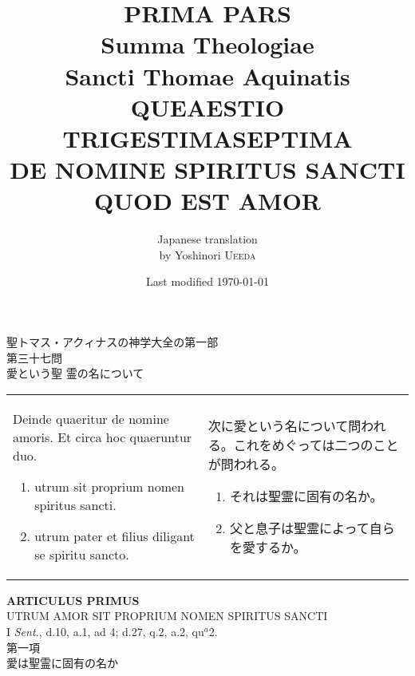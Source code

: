 \documentclass[10pt]{jsarticle} %
\title{{\bf PRIMA PARS}\\{\Huge Summa Theologiae}\\Sancti Thomae
Aquinatis\\{\sffamily QUEAESTIO TRIGESTIMASEPTIMA}\\DE NOMINE SPIRITUS
SANCTI QUOD EST AMOR}
\author{Japanese translation\\by Yoshinori {\scshape Ueeda}}
\date{Last modified \today}
\begin{document}
\maketitle

\begin{center}
{\Large 聖トマス・アクィナスの神学大全の第一部\\第三十七問\\愛という聖
 霊の名について}
\end{center}

\thispagestyle{empty}
\begin{longtable}{p{21em}p{21em}}
Deinde quaeritur de nomine amoris. Et circa hoc quaeruntur duo. 

\begin{enumerate}
 \item utrum sit proprium nomen spiritus sancti.
 \item utrum pater et filius diligant se spiritu sancto.
\end{enumerate}

&

次に愛という名について問われる。これをめぐっては二つのことが問われる。

\begin{enumerate}
 \item それは聖霊に固有の名か。
 \item 父と息子は聖霊によって自らを愛するか。
\end{enumerate}

\end{longtable}



\newpage


\begin{center}
{\Large {\bf ARTICULUS PRIMUS}}\\
{\large UTRUM AMOR SIT PROPRIUM NOMEN SPIRITUS SANCTI}\\
{\footnotesize I {\itshape Sent.}, d.10, a.1, ad 4; d.27, q.2, a.2, qu$^{a}$2.}\\
{\Large 第一項\\愛は聖霊に固有の名か}
\end{center}
\end{document}
